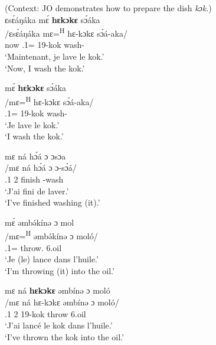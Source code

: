 \documentclass[output=paper,colorlinks,citecolor=brown
]{langscibook}
\begin{document}
\z
\z

\ea \label{kokreference} (Context: JO demonstrates how to prepare the dish \textit{kɔk}.) \\
\ea
\glll
{\db}ɛsɛ́áŋáka	mɛ́ \textbf{hɛkɔkɛ}	sɔ́áka \\
/ɛsɛ́áŋáka	mɛ=\textsuperscript{H}	hɛ-kɔkɛ	sɔ́á-aka/ \\
{\db}now	\SM{}.1\SG{}=\PROC{}	19-kok	wash-\DUR{} \\
\glt
`Maintenant, je lave le kok.' \\ `Now, I wash the kok.' \jambox*{[JO 1343; 00:00:38] }

\ex
\glll
{\db}mɛ́	\textbf{hɛkɔkɛ}	sɔ́áka \\
/mɛ=\textsuperscript{H}	hɛ-kɔkɛ	sɔ́á-aka/ \\
{\db}\SM{}.1\SG{}=\PROC{}	19-kok	wash-\DUR{} \\
\glt
`Je lave le kok.' \\ `I wash the kok.' \jambox*{[JO 1344; 00:00:58] }

\ex
\glll
{\db}mɛ ná hɔ́á ɔ ɔsɔa \\
/mɛ ná	hɔ́á	ɔ	ɔ-sɔ́á/ \\
{\db}\SM{}.1\SG{} \PST{}2{}	finish	\PREP{}	 \INF{}-wash\\
\glt
`J'ai fini de laver.' \\ `I've finished washing (it).' \jambox*{[JO 1345; 00:01:34] }

\ex
\glll
{\db}mɛ́	əmbə́kínə	ɔ	mol \\ %
/mɛ=\textsuperscript{H}	əmbə́kínə	ɔ	moló/ \\
{\db}\SM{}.1\SG{}=\PROC{}	throw.\REP{} \PREP{} 6.oil \\
\glt
`Je (le) lance dans l'huile.' \\ `I'm throwing (it) into the oil.' \jambox*{[JO 1346; 00:01:38 ] }

\ex
\label{kokend}
\glll
{\db}mɛ ná	\textbf{hɛkɔkɛ}	əmbínə	ɔ	moló \\ %
/mɛ ná	hɛ-kɔkɛ	əmbínə	ɔ	moló/ \\
{\db}\SM{}.1\SG{} \PST{}2{}	19-kok	throw	\PREP{}	6.oil \\
\glt
`J'ai lancé le kok dans l'huile.'\\ `I've thrown the kok into the oil.' \jambox*{[JO 1347; 00:03:19] }
\end{document}
